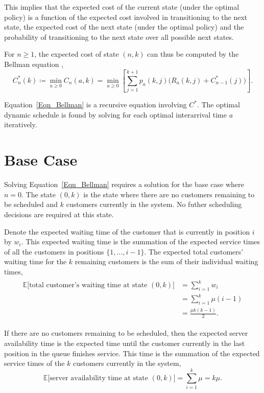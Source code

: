 This implies that the expected cost of the current state (under the optimal policy) is a function of the expected cost involved in transitioning to the next state, the expected cost of the next state (under the optimal policy) and the probability of transitioning to the next state over all possible next states.

For $n \geq 1$, the expected cost of state $(n, k)$ can thus be computed by the Bellman equation \citep{Bellman},
\begin{equation}
	C_{n}^{*} (k) \coloneqq \min_{a \geq 0} C_{n} (a, k) = \min_{a \geq 0} \left[ \sum_{j = 1}^{k + 1} p_{a} (k, j) \Big( R_{a} (k, j) + C_{n - 1}^{*} (j) \Big) \right].
	\label{Eqn_Bellman}
\end{equation}

Equation~\ref{Eqn_Bellman} is a recursive equation involving $C^{*}$. The optimal dynamic schedule is found by solving for each optimal interarrival time $a$ iteratively.

\section{Base Case}
Solving Equation~\ref{Eqn_Bellman} requires a solution for the base case where $n = 0$. The state $(0, k)$ is the state where there are no customers remaining to be scheduled and $k$ customers currently in the system. No futher scheduling decisions are required at this state.

Denote the expected waiting time of the customer that is currently in position $i$ by $w_{i}$. This expected waiting time is the summation of the expected service times of all the customers in positions $\{ 1, \ldots, i - 1 \}$. The expected total customers' waiting time for the $k$ remaining customers is the sum of their individual waiting times,
\begin{align}
	\begin{split}
		\mathbb{E} \Big[\text{total customer's waiting time at state $(0, k)$} \Big] & = \sum_{i = 1}^{k} w_{i} \\
		& = \sum_{i = 1}^{k} \mu (i - 1) \\
		& = \frac{\mu k (k - 1)}{2}.
	\end{split}
\end{align}

If there are no customers remaining to be scheduled, then the expected server availability time is the expected time until the customer currently in the last position in the queue finishes service. This time is the summation of the expected service times of the $k$ customers currently in the system,
\begin{equation}
	\mathbb{E} \Big[\text{server availability time at state $(0, k)$} \Big] = \sum_{i = 1}^{k} \mu = k \mu.
\end{equation}


